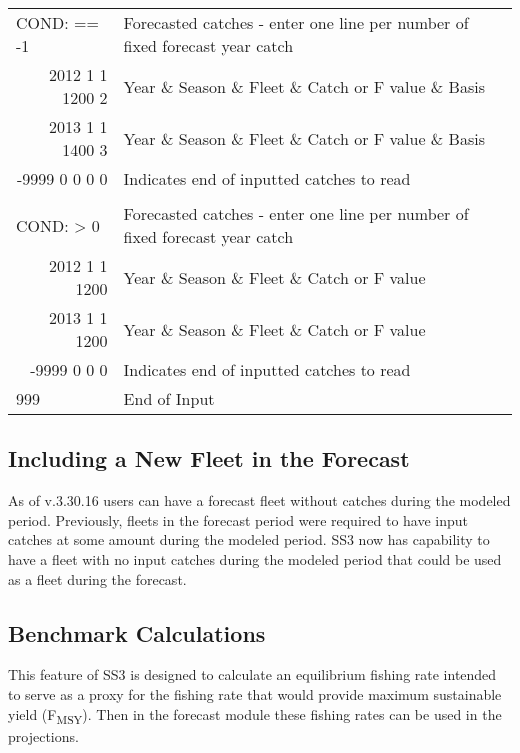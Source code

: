 \begin{landscape}
{\begin{longtable}{p{3.2cm} p{7cm} p{10.8cm}}
  \hline
  \multicolumn{1}{l}{COND: == -1 }& \multicolumn{2}{l}{Forecasted catches - enter one line per number of fixed forecast year catch} \Tstrut\\
  \multicolumn{1}{r}{2012 1 1 1200 2}  & \multicolumn{2}{l}{Year \& Season \& Fleet \& Catch or F value \& Basis}  \\
  \multicolumn{1}{r}{2013 1 1 1400 3}  & \multicolumn{2}{l}{Year \& Season \& Fleet \& Catch or F value \& Basis}  \\
  \multicolumn{1}{r}{-9999 0 0 0 0}  & \multicolumn{2}{l}{Indicates end of inputted catches to read}  \Bstrut\\
  \\
  \multicolumn{1}{l}{COND: > 0 }& \multicolumn{2}{l}{Forecasted catches - enter one line per number of fixed forecast year catch }\Tstrut\\
  \multicolumn{1}{r}{2012  1 1 1200}  & \multicolumn{2}{l}{Year \& Season \& Fleet \& Catch or F value}  \\
  \multicolumn{1}{r}{2013  1 1 1200}  & \multicolumn{2}{l}{Year \& Season \& Fleet \& Catch or F value}  \\
  \multicolumn{1}{r}{-9999 0 0 0}  & \multicolumn{2}{l}{Indicates end of inputted catches to read}  \Bstrut\\
  
  \hline
  999 & End of Input & \Bstrut\\

  \end{longtable}}  
\end{landscape}

\subsection{Including a New Fleet in the Forecast}
As of v.3.30.16 users can have a forecast fleet without catches during the modeled period. Previously, fleets in the forecast period were required to have input catches at some amount during the modeled period. SS3 now has capability to have a fleet with no input catches during the modeled period that could be used as a fleet during the forecast.

\hypertarget{Benchmark}{}
\subsection{Benchmark Calculations}
This feature of SS3 is designed to calculate an equilibrium fishing rate intended to serve as a proxy for the fishing rate that would provide maximum sustainable yield (F\textsubscript{MSY}).  Then in the forecast module these fishing rates can be used in the projections.

